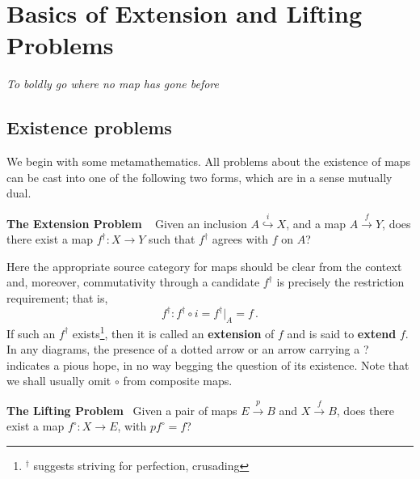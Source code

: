 

\chapter{Basics of Extension and Lifting Problems}
\begin{center}
{\small\em To boldly go where no map has gone before}
\end{center}

\section{Existence problems}
We begin with some metamathematics.
All problems about the existence of maps can be cast into one of the
following two forms, which are in a sense mutually dual.

\noindent
{\bf The Extension Problem} \    %
Given an inclusion $ A \stackrel{i}{\hookrightarrow} X $, and a map
$ A \stackrel{f}{\rightarrow} Y $,
does there exist a map $f^{\dagger}:X\to Y$ such that
$f^{\dagger}$ agrees with $f$ on $A$?

Here the appropriate source category for maps should be clear from the
context and, moreover, commutativity through a
candidate $f^{\dagger}$ is precisely
the restriction requirement; that is,
$$f^{\dagger}   :  f^{\dagger}\circ i = f^{\dagger}|_A = f\,. $$
If such an $f^{\dagger}$ exists\footnote{${}^{\dagger}$ suggests striving
for perfection, crusading}, then it is called an {\bf
extension} of $f$ and is said to {\bf
extend} $f$. In any diagrams, the presence of
a dotted arrow or an arrow carrying a ? indicates a pious hope, in no way
begging the question of its existence. Note that we shall usually
omit $\circ$ from composite maps.

\noindent
{\bf The Lifting Problem} \
Given a pair of maps $E \stackrel{p}{\rightarrow}B$ and $X \stackrel{f}
{\rightarrow} B $,
does there exist a map $f^{\circ} : X \to E$, with
$pf^{\circ} = f  $?


